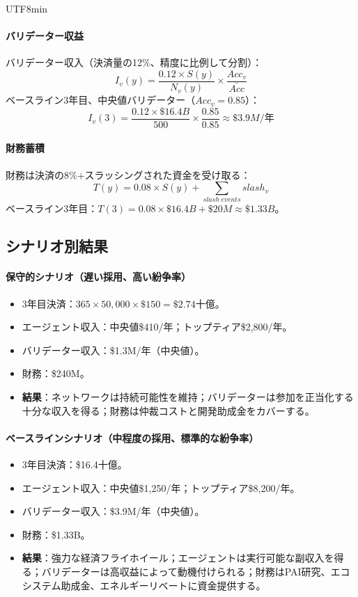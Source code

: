 \documentclass[11pt]{article}
\begin{document}
\begin{CJK}{UTF8}{min}
\paragraph{バリデーター収益} バリデーター収入（決済量の12\%、精度に比例して分割）：
\begin{equation}
I_v(y) = \frac{0.12 \times S(y)}{N_v(y)} \times \frac{Acc_v}{\bar{Acc}}
\end{equation}
ベースライン3年目、中央値バリデーター（$Acc_v = 0.85$）：
\begin{equation}
I_v(3) = \frac{0.12 \times \$16.4B}{500} \times \frac{0.85}{0.85} \approx \$3.9M \text{/年}
\end{equation}

\paragraph{財務蓄積} 財務は決済の8\%+スラッシングされた資金を受け取る：
\begin{equation}
T(y) = 0.08 \times S(y) + \sum_{slash \; events} slash_v
\end{equation}
ベースライン3年目：$T(3) = 0.08 \times \$16.4B + \$20M \approx \$1.33B$。

\subsection{シナリオ別結果}
\paragraph{保守的シナリオ（遅い採用、高い紛争率）}
\begin{itemize}[noitemsep]
  \item 3年目決済：$365 \times 50{,}000 \times \$150 = \$2.74$十億。
  \item エージェント収入：中央値\$410/年；トップティア\$2{,}800/年。
  \item バリデーター収入：\$1.3M/年（中央値）。
  \item 財務：\$240M。
  \item \textbf{結果}：ネットワークは持続可能性を維持；バリデーターは参加を正当化する十分な収入を得る；財務は仲裁コストと開発助成金をカバーする。
\end{itemize}

\paragraph{ベースラインシナリオ（中程度の採用、標準的な紛争率）}
\begin{itemize}[noitemsep]
  \item 3年目決済：\$16.4十億。
  \item エージェント収入：中央値\$1{,}250/年；トップティア\$8{,}200/年。
  \item バリデーター収入：\$3.9M/年（中央値）。
  \item 財務：\$1.33B。
  \item \textbf{結果}：強力な経済フライホイール；エージェントは実行可能な副収入を得る；バリデーターは高収益によって動機付けられる；財務はPAI研究、エコシステム助成金、エネルギーリベートに資金提供する。
\end{itemize}


\end{CJK}
\end{document}
